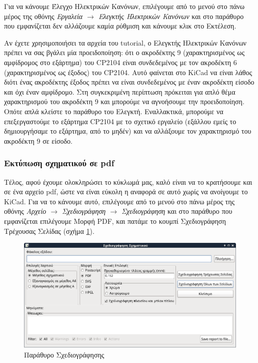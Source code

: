 \documentclass[a4paper]{article}
\begin{document}
Για να κάνουμε Έλεγχο Ηλεκτρικών Κανόνων, επιλέγουμε από το μενού στο πάνω μέρος της οθόνης \textit{Εργαλεία $\rightarrow$ Ελεγκτής Ηλεκτρικών Κανόνων} και στο παράθυρο που εμφανίζεται δεν αλλάζουμε καμία ρύθμιση και κάνουμε κλικ στο Εκτέλεση. 

Αν έχετε χρησιμοποιήσει τα αρχεία του tutorial, ο Ελεγκτής Ηλεκτρικών Κανόνων πρέπει να σας βγάλει μία προειδοποίηση: ότι ο ακροδέκτης 9 (χαρακτηρισμένος ως αμφίδρομος στο εξάρτημα) του CP2104 είναι συνδεδεμένος με τον ακροδέκτη 6 (χαρακτηρισμένος ως έξοδος) του CP2104. Αυτό φαίνεται στο \textenglish{KiCad} να είναι λάθος διότι ένας ακροδέκτης έξοδος πρέπει να είναι συνδεδεμένος με έναν ακροδέκτη είσοδο και όχι έναν αμφίδρομο. Στη συγκεκριμένη περίπτωση πρόκειται για απλό θέμα χαρακτηρισμού του ακροδέκτη 9 και μπορούμε να αγνοήσουμε την προειδοποίηση. Οπότε απλά κλείστε το παράθυρο του Ελεγκτή.
Εναλλακτικά, μπορούμε να επεξεργαστούμε το εξάρτημα CP2104 με το σχετικό εργαλείο (εξάλλου εμείς το δημιουργήσαμε το εξάρτημα, από το μηδέν) και να αλλάξουμε τον χαρακτηρισμό του ακροδέκτη 9 σε είσοδο.

\subsubsection{Εκτύπωση σχηματικού σε pdf}
Τέλος, αφού έχουμε ολοκληρώσει το κύκλωμά μας, καλό είναι να το κρατήσουμε και σε ένα αρχείο pdf, ώστε να είναι εύκολη η αναφορά σε αυτό χωρίς να ανοίγουμε το \textenglish{KiCad}. Για να το κάνουμε αυτό, επιλέγουμε από το μενού στο πάνω μέρος της οθόνης \textit{Αρχείο $\rightarrow$ Σχεδιογράφηση $\rightarrow$ Σχεδιογράφηση} και στο παράθυρο που εμφανίζεται επιλέγουμε Μορφή PDF, και πατάμε το κουμπί Σχεδιογράφηση Τρέχουσας Σελίδας (σχήμα \ref{fig:eesch-dial-plot}). 

\begin{figure}
  \begin{center}
    \includegraphics[width=.5\textwidth]{img/eesch-dial-plot.png}
    \caption{Παράθυρο Σχεδιογράφησης}
    \label{fig:eesch-dial-plot}
  \end{center}
\end{figure}
\end{document}
